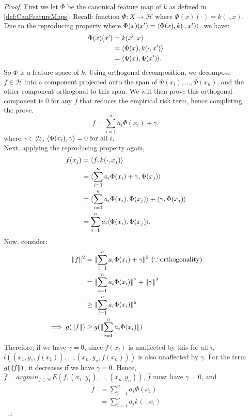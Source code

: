 \documentclass[twoside]{memoir}
\begin{document}
	\begin{proof}
		First we let $\Phi$ be the canonical feature map of $k$ as defined in \ref{def:CanFeatureMaps}. Recall: function $\Phi: X \rightarrow \mathcal{H}$ where $\Phi(x)(\cdot) = k(\cdot , x)$. Due to the reproducing property where $\Phi(x)(x') = \langle\Phi(x), k(\cdot, x')\rangle$, we have:
		\begin{equation*}
		\begin{split}
		\Phi(x)(x') &= k(x', x) \\
		&= \langle\Phi(x), k(\cdot, x')\rangle \\
		&= \langle\Phi(x), \Phi(x')\rangle. 
		\end{split}
		\end{equation*}
		So $\Phi$ is a feature space of $k$. Using orthogonal decomposition, we decompose $f \in \mathcal{H}$ into a component projected onto the span of ${\Phi(x_i), ..., \Phi(x_n)}$, and the other component orthogonal to this span. We will then prove this orthogonal component is $0$ for any $f$ that reduces the empirical risk  term, hence completing the prove.
		\[ f = \sum_{i=1}^{n} a_i \Phi(x_i) + \gamma, \]
		where $\gamma \in \mathcal{H}$, $\langle\Phi(x_i), \gamma\rangle = 0 \text{ for all } i$.\\
		Next, applying the reproducing property again,
		\begin{equation*}
		\begin{split}
		f(x_j) &= \langle f, k(\cdot, x_j)\rangle \\
		&= \langle\sum_{i=1}^{n} a_i \Phi(x_i) + \gamma, \Phi(x_j)\rangle \\
		&= \langle\sum_{i=1}^{n} a_i \Phi(x_i),  \Phi(x_j)\rangle + \langle\gamma,  \Phi(x_j)\rangle \\
		&= \sum_{i=1}^{n} a_i \langle\Phi(x_i),  \Phi(x_j)\rangle.
		\end{split}
		\end{equation*}
		Now, consider:
		\begin{equation*}
		\begin{split}
		\lVert f\rVert^2 &= \lVert\sum_{i=1}^{n} a_i \Phi(x_i) + \gamma\rVert^2 ~ (\because \text{orthogonality})\\
		&=  \lVert\sum_{i=1}^{n} a_i \Phi(x_i)\rVert^2 + \lVert\gamma\rVert^2 \\
		&\geq \lVert\sum_{i=1}^{n} a_i \Phi(x_i)\rVert^2 \\
		\implies g(\lVert f\rVert) &\geq g(\lVert\sum_{i=1}^{n} a_i \Phi(x_i)\rVert)
		\end{split}
		\end{equation*}
		Therefore, if we have $\gamma = 0$, since $f(x_i)$ is unaffected by this for all $i$, 
		$l((x_1, y_1, f(x_1)), ..., (x_n, y_n, f(x_n)))$ is also unaffected by $\gamma$. For the term $g(\lVert f\rVert)$, it decreases if we have $\gamma = 0$. Hence,  $\hat{f} = argmin_{f \in \mathcal{H}} E(f, (x_1, y_1), ..., (x_n, y_n))$, $\hat{f}$ must have $\gamma = 0$, and 
		\begin{equation*}
		\begin{split}
		\hat{f} &= \sum_{i=1}^{n} a_i \Phi(x_i) \\
		&=  \sum_{i=1}^{n} a_i k(\cdot, x_i)
		\end{split}
		\end{equation*}
	\end{proof}
\end{document}
